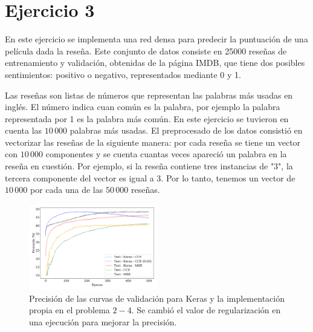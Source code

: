 


    \section*{Ejercicio 3}

    En este ejercicio se implementa  una red densa para predecir la puntuación de una película dada la reseña. Este conjunto de datos consiste en 25000 reseñas de entrenamiento y validación, obtenidas de la página IMDB, que tiene dos posibles sentimientos: positivo o negativo, representados mediante 0 y 1.
    
    Las reseñas son listas de números que representan las palabras más usadas en inglés. El número indica cuan común es la palabra, por ejemplo la palabra representada por 1 es la palabra más común. En este ejercicio se tuvieron en cuenta las $10\,000$ palabras más usadas. El preprocesado de los datos consistió en vectorizar las reseñas de la siguiente manera: por cada reseña se tiene un vector con $10\,000$ componentes y se cuenta cuantas veces apareció un palabra en la reseña en cuestión. Por ejemplo, si la reseña contiene tres instancias de "3", la tercera componente del vector es igual a 3. Por lo tanto, tenemos un vector de $10\,000$ por cada una de las $50\,000$ reseñas.

    \begin{figure}[H]
        \begin{small}
            \begin{center}
                \includegraphics[width=0.5\textwidth]{Graphs/ejer2_4_acc.pdf}
            \end{center}
            \caption{Precisión de las curvas de validación para Keras y la implementación propia en el problema $2-4$. Se cambió el valor de regularización en una ejecución para mejorar la precisión.}
            \label{fig:ejer2_4_acc}
        \end{small}
    \end{figure}


